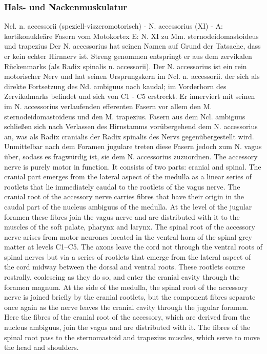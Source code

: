 \documentclass[12pt,a4paper,pdftex]{article}
\begin{document}
\subsubsection{Hals- und Nackenmuskulatur}
Ncl. n. accessorii (speziell-viszeromotorisch) - N. accessorius (XI) - A: kortikonukleäre Fasern vom Motokortex E: N. XI zu Mm. sternodeidomastoideus und trapezius 
Der N. accessorius hat seinen Namen auf Grund der Tatsache, dass er kein echter Hirnnerv ist. Streng genommen entspringt er aus dem zervikalen Rückenmarks (als Radix spinalis
n. accessorii). Der N. accessorius ist ein rein motorischer Nerv und hat seinen Ursprungskern im Ncl. n. accessorii. der sich als direkte Fortsetzung des Nd. ambiguus nach kaudal;
im Vorderhorn des Zervikalmarks befindet und sich von C1 - C5 erstreckt. Er innerviert mit seinen im N. accessorius verlaufenden efferenten Fasern vor allem den M. sternodeidomastoideus und den M. trapezius. Fasern aus dem Ncl. ambiguus schließen sich nach Verlassen des Hirnstamms vorübergehend dem N. accessorius an, was als Radix cranialis der Radix spinalis des Nervs
gegenübergestellt wird. Unmittelbar nach dem Foramen jugulare treten diese Fasern jedoch zum N. vagus über, sodass es fragwürdig ist, sie dem N. accessorius zuzuordnen.
The accessory nerve is purely motor in function. It consists of two parts: cranial and spinal. The cranial part emerges from the lateral aspect of the medulla as a linear series of rootlets
that lie immediately caudal to the rootlets of the vagus nerve. The cranial root of the accessory nerve carries fibres that have their origin in the caudal part of the nucleus ambiguus of the medulla. At the level of the jugular foramen these fibres join the vagus nerve and are distributed with it to the muscles of the soft palate, pharynx and larynx. The spinal root of the accessory nerve arises from motor neurones located in the ventral horn of the spinal grey matter at levels C1–C5. The axons leave the cord not through the ventral roots of spinal nerves but via a series of rootlets that emerge from the lateral aspect of the cord midway between the dorsal and ventral roots. These rootlets course rostrally, coalescing as they do so, and enter the cranial cavity through the foramen magnum. At the side of the medulla, the spinal root of the accessory nerve is joined briefly by the cranial rootlets, but the component fibres separate once again as the nerve leaves the cranial cavity through the jugular foramen. Here the fibres of the cranial root of the accessory, which are derived from the nucleus ambiguus, join the vagus and are distributed with it. The fibres of the spinal root pass to the sternomastoid and trapezius muscles, which serve to move the head and shoulders.
\end{document}
